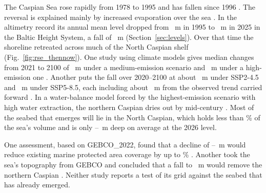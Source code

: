 The Caspian Sea rose rapidly from 1978 to 1995 and has fallen since 1996 \citep{lahijani2023}. The reversal is explained mainly by increased evaporation over the sea \citep{chen2017}. In the altimetry record its annual mean level dropped from ~m in 1995 to ~m in 2025 in the Baltic Height System, a fall of ~m (Section~\ref{sec:levels}). Over that time the shoreline retreated across much of the North Caspian shelf (Fig.~\ref{fig:rse_thennow}). One study using  climate models gives median changes from 2021 to 2100 of ~m under a medium-emission scenario and ~m under a high-emission one \citep{hoseini2025}. Another puts the fall over 2020--2100 at about ~m under SSP2-4.5 and ~m under SSP5-8.5, each including about ~m from the observed trend carried forward \citep{samant2023}. In a water-balance model forced by the highest-emission scenario with high water extraction, the northern Caspian dries out by mid-century \citep{koriche2021}. Most of the seabed that emerges will lie in the North Caspian, which holds less than \% of the sea's volume \citep{akbari2020} and is only --~m deep on average at the 2026 level.



One assessment, based on GEBCO\_2022, found that a decline of --~m would reduce existing marine protected area coverage by up to \% \citep{court2025}. Another took the sea's topography from GEBCO and concluded that a fall to ~m would remove the northern Caspian \citep{duan2025}. Neither study reports a test of its grid against the seabed that has already emerged.

